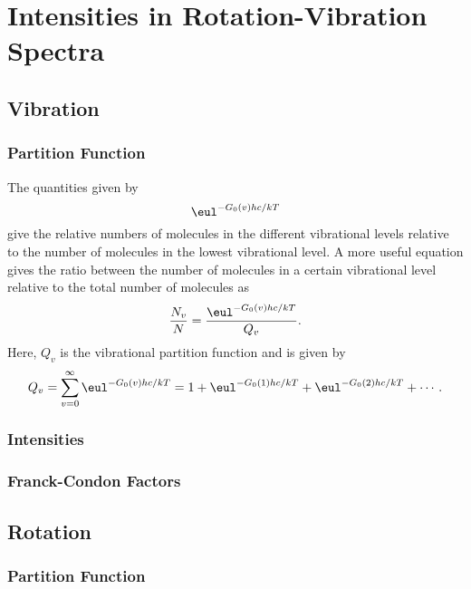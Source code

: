 \chapter{Intensities in Rotation-Vibration Spectra}
\label{c:intensities_in_rotation-vibration_spectra}

\section{Vibration}
\label{s:vibration}

\subsection{Partition Function}

The quantities given by
\begin{equation*}
    \eul^{-G_{0}(v)hc/kT}
\end{equation*}
give the relative numbers of molecules in the different vibrational levels relative to the number of molecules in the lowest vibrational level. A more useful equation gives the ratio between the number of molecules in a certain vibrational level relative to the total number of molecules as
\begin{equation*}
    \frac{N_{v}}{N} = \frac{\eul^{-G_{0}(v)hc / kT}}{Q_{v}}.
\end{equation*}
Here, $Q_{v}$ is the vibrational partition function and is given by
\begin{equation*}
    Q_{v} = \sum_{v=0}^{\infty}\eul^{-G_{0}(v)hc / kT} = 1 + \eul^{-G_{0}(1)hc / kT} + \eul^{-G_{0}(2)hc / kT} + \dotsb.
\end{equation*}

\subsection{Intensities}

\subsection{Franck-Condon Factors}

\section{Rotation}
\label{s:rotation}

\subsection{Partition Function}

